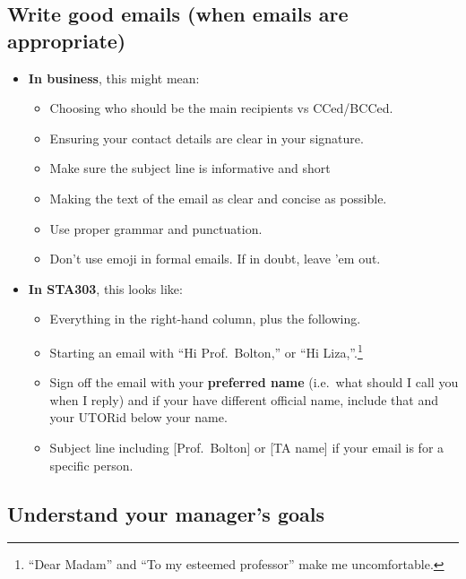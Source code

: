 \documentclass[
  openany]{book}
\providecommand{\tightlist}{%
  \setlength{\itemsep}{0pt}\setlength{\parskip}{0pt}}
\begin{document}
\hypertarget{write-good-emails-when-emails-are-appropriate}{%
\subsection{Write good emails (when emails are appropriate)}\label{write-good-emails-when-emails-are-appropriate}}

\begin{itemize}
\tightlist
\item
  \textbf{In business}, this might mean:

  \begin{itemize}
  \tightlist
  \item
    Choosing who should be the main recipients vs CCed/BCCed.
  \item
    Ensuring your contact details are clear in your signature.
  \item
    Make sure the subject line is informative and short
  \item
    Making the text of the email as clear and concise as possible.
  \item
    Use proper grammar and punctuation.
  \item
    Don't use emoji in formal emails. If in doubt, leave 'em out.
  \end{itemize}
\item
  \textbf{In STA303}, this looks like:

  \begin{itemize}
  \tightlist
  \item
    Everything in the right-hand column, plus the following.
  \item
    Starting an email with ``Hi Prof.~Bolton,'' or ``Hi Liza,''.\footnote{``Dear Madam'' and ``To my esteemed professor'' make me uncomfortable.}
  \item
    Sign off the email with your \textbf{preferred name} (i.e.~what should I call you when I reply) and if your have different official name, include that and your UTORid below your name.
  \item
    Subject line including {[}Prof.~Bolton{]} or {[}TA name{]} if your email is for a specific person.
  \end{itemize}
\end{itemize}

\hypertarget{understand-your-managers-goals}{%
\subsection{Understand your manager's goals}\label{understand-your-managers-goals}}
\end{document}
